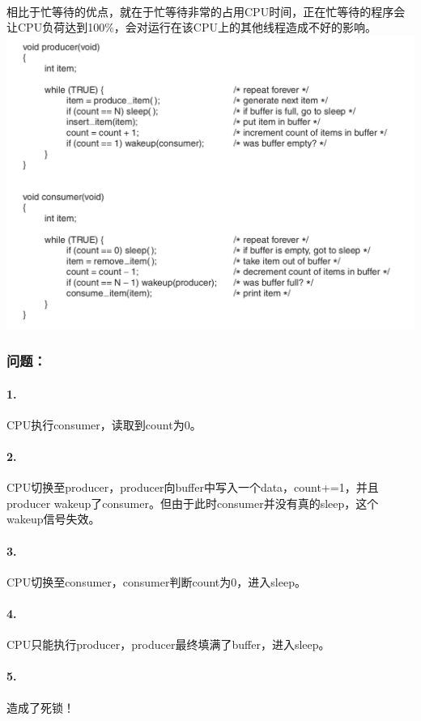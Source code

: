 \documentclass[12pt]{article}
\begin{document}
\begin{CJK}{UTF8}{gbsn}
\paragraph{}相比于忙等待的优点，就在于忙等待非常的占用CPU时间，正在忙等待的程序会让CPU负荷达到100\%，会对运行在该CPU上的其他线程造成不好的影响。\\
\includegraphics[width=6in]{saw.png}
\subsubsection{问题：}
\paragraph{1.}CPU执行consumer，读取到count为0。
\paragraph{2.}CPU切换至producer，producer向buffer中写入一个data，count+=1，并且producer wakeup了consumer。但由于此时consumer并没有真的sleep，这个wakeup信号失效。
\paragraph{3.}CPU切换至consumer，consumer判断count为0，进入sleep。
\paragraph{4.}CPU只能执行producer，producer最终填满了buffer，进入sleep。
\paragraph{5.}造成了死锁！

\end{CJK}
\end{document}

